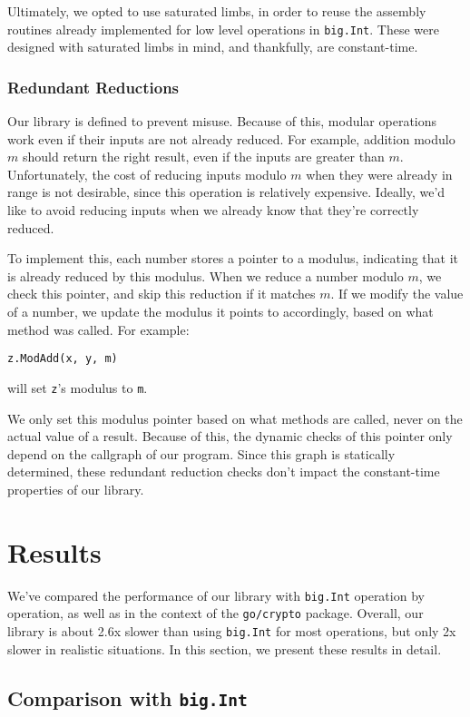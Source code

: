 \documentclass[11pt, a4paper]{article} %
\begin{document}
{Ultimately, we opted to use saturated limbs, in order to reuse
the assembly routines already implemented for low level
operations in \texttt{big.Int}. These were designed with
saturated limbs in mind, and thankfully, are constant-time.

\subsubsection{Redundant Reductions}

Our library is defined to prevent misuse. Because of this,
modular operations work even if their inputs are not already
reduced. For example, addition modulo $m$ should return the
right result, even if the inputs are greater than $m$.
Unfortunately, the cost of reducing inputs modulo $m$ when
they were already in range is not desirable, since this operation
is relatively expensive. Ideally, we'd like to avoid reducing
inputs when we already know that they're correctly reduced.

To implement this, each number stores a pointer to a modulus,
indicating that it is already reduced by this modulus.
When we reduce a number modulo $m$, we check this pointer,
and skip this reduction if it matches $m$. If we modify
the value of a number, we update the modulus it points to
accordingly, based on what method was called.
For example:
\begin{verbatim}
z.ModAdd(x, y, m)
\end{verbatim}
will set \texttt{z}'s modulus to \texttt{m}.

We only set this modulus pointer based on what methods are called,
never on the actual value of a result. Because of this, the dynamic
checks of this pointer only depend on the callgraph of our program.
Since this graph is statically determined, these redundant reduction
checks don't impact the constant-time properties of our library.

\section{Results}

We've compared the performance of our library
with \texttt{big.Int} operation by operation, as well as in the
context of the \texttt{go/crypto} package.
Overall, our library is about 2.6x slower than using
\texttt{big.Int} for most operations,
but only 2x slower in realistic situations.
In this section, we
present these results in detail.

\subsection{Comparison with \texttt{big.Int}}

}
\end{document}
